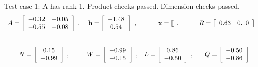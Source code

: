 \newpage
\footnotesize{
Test case 1: A has rank 1. Product checks passed. Dimension checks passed.
\[
\begin{array}{*{4}{c}}
A = \left[\begin{array}{*{2}c}
	-0.32 & -0.05\\
	-0.55 & -0.08
\end{array}\right]
\;, & 
\mathbf{b} = \left[\begin{array}{*{1}c}
	-1.48\\
	0.54
\end{array}\right]
\;, & 
\mathbf{x} = []\;, & 
R = \left[\begin{array}{*{2}c}
	0.63 & 0.10
\end{array}\right]
\\
\\\mbox{}\\
N = \left[\begin{array}{*{1}c}
	0.15\\
	-0.99
\end{array}\right]
\;, & 
W = \left[\begin{array}{*{1}c}
	-0.99\\
	-0.15
\end{array}\right]
\;, & 
L = \left[\begin{array}{*{1}c}
	0.86\\
	-0.50
\end{array}\right]
\;, & 
Q = \left[\begin{array}{*{1}c}
	-0.50\\
	-0.86
\end{array}\right]
\\
\end{array}
\]
\hrulefill

}
